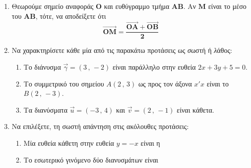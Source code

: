 \documentclass[12pt,a4page]{article}
\begin{document}
\authoritylogo[3]
\hfill%
\examdetailsii

\vspace{4ex}


\vspace*{1.0ex}

\setlength \baselineskip{14.5pt}

\begin{schltask}[label=\textbf{ΘΕΜΑ \Alph*}]
\item \leavevmode%
  \begin{enumerate}[label=\bf Α\arabic*.,before=\vspace{-2ex},leftmargin=24pt]
  \item Θεωρούμε σημείο αναφοράς $\bm{O}$ και ευθύγραμμο τμήμα $\bm{AB}$. Αν $\bm{M}$ είναι το μέσο του $\bm{AB}$, τότε, να αποδείξετε ότι\phantom{.} %
    $$\bm{\overrightarrow{OM} = \frac{\overrightarrow{OA} + \overrightarrow{OB}}{2}}$$
  \item Να χαρακτηρίσετε κάθε μία από τις παρακάτω προτάσεις ως {\textit σωστή} ή {\textit λάθος}:
  \begin{enumerate}[label=\bf\roman*)]
  \item Το διάνυσμα $\vec{\gamma} = (3 \,,\, -2)$ είναι παράλληλο στην ευθεία $2x + 3y + 5 = 0$.
  \item Το συμμετρικό του σημείου $A(2 \,,\, 3)$ ως προς τον άξονα $x'x$ είναι το $B(2 \,,\, -3)$.
  \item  Τα διανύσματα $\vec{u} = (-3 \,,\, 4)$ και $\vec{v} = (2 \,,\, -1)$ είναι κάθετα.
  \end{enumerate}
\item Να επιλέξετε, τη σωστή απάντηση στις ακόλουθες προτάσεις: 
  \begin{enumerate}[label=\bf\roman*)]
  \item Μία ευθεία κάθετη στην ευθεία $y = -x$ είναι η\\
  \item Το εσωτερικό γινόμενο δύο διανυσμάτων είναι\\

\end{enumerate}
\end{enumerate}
\end{schltask}
\end{document}
